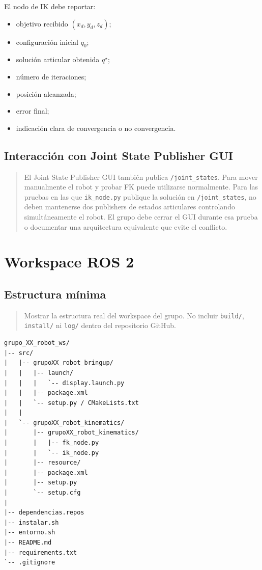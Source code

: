 \documentclass[journal]{IEEEtran}
\newcommand{\instr}[1]{%
\begin{quote}
\small
\noindent\textbf{\color{blue}{INSTRUCCIÓN:}} #1
\end{quote}
}
\begin{document}
El nodo de IK debe reportar:

\begin{itemize}
    \item objetivo recibido $(x_d,y_d,z_d)$;
    \item configuración inicial $q_0$;
    \item solución articular obtenida $q^\star$;
    \item número de iteraciones;
    \item posición alcanzada;
    \item error final;
    \item indicación clara de convergencia o no convergencia.
\end{itemize}

\subsection{Interacción con Joint State Publisher GUI}

\instr{El Joint State Publisher GUI también publica \texttt{/joint\_states}. Para mover manualmente el robot y probar FK puede utilizarse normalmente. Para las pruebas en las que \texttt{ik\_node.py} publique la solución en \texttt{/joint\_states}, no deben mantenerse dos publishers de estados articulares controlando simultáneamente el robot. El grupo debe cerrar el GUI durante esa prueba o documentar una arquitectura equivalente que evite el conflicto.}

\section{Workspace ROS 2}

\subsection{Estructura mínima}

\instr{Mostrar la estructura real del workspace del grupo. No incluir \texttt{build/}, \texttt{install/} ni \texttt{log/} dentro del repositorio GitHub.}

\begin{lstlisting}
grupo_XX_robot_ws/
|-- src/
|   |-- grupoXX_robot_bringup/
|   |   |-- launch/
|   |   |   `-- display.launch.py
|   |   |-- package.xml
|   |   `-- setup.py / CMakeLists.txt
|   |
|   `-- grupoXX_robot_kinematics/
|       |-- grupoXX_robot_kinematics/
|       |   |-- fk_node.py
|       |   `-- ik_node.py
|       |-- resource/
|       |-- package.xml
|       |-- setup.py
|       `-- setup.cfg
|
|-- dependencias.repos
|-- instalar.sh
|-- entorno.sh
|-- README.md
|-- requirements.txt
`-- .gitignore
\end{lstlisting}
\end{document}
